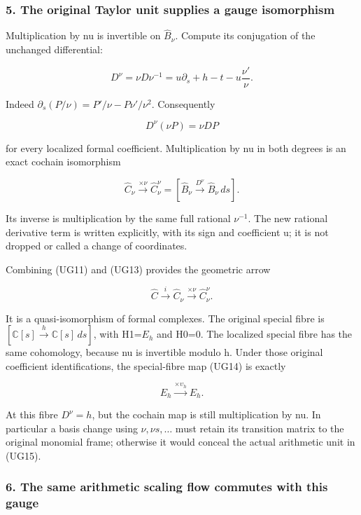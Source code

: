 \subsubsection{5. The original Taylor unit supplies a gauge isomorphism}\label{endpoint-f1_unit_gauge--the-original-taylor-unit-supplies-a-gauge-isomorphism}

Multiplication by nu is invertible on \(\widehat B_\nu\). Compute its conjugation of the unchanged differential:

\[
\boxed{D^{\nu}=\nu D\nu^{-1}
=u\partial_s+h-t-u\frac{\nu'}{\nu}.}
\tag{UG12}
\]

Indeed \(\partial_s(P/\nu)=P'/\nu-P\nu'/\nu^2\). Consequently

\[
D^{\nu}(\nu P)=\nu DP
\]

for every localized formal coefficient. Multiplication by nu in both degrees is an exact cochain isomorphism

\[
\widehat C_\nu\xrightarrow{\times\nu}
\widehat C_\nu^{\nu}
=[\widehat B_\nu\xrightarrow{D^{\nu}}\widehat B_\nu\,ds].
\tag{UG13}
\]

Its inverse is multiplication by the same full rational \(\nu^{-1}\). The new rational derivative term is written explicitly, with its sign and coefficient u; it is not dropped or called a change of coordinates.

Combining (UG11) and (UG13) provides the geometric arrow

\[
\boxed{\widehat C\xrightarrow{i}\widehat C_\nu
\xrightarrow{\times\nu}\widehat C_\nu^{\nu}.}
\tag{UG14}
\]

It is a quasi-isomorphism of formal complexes. The original special fibre is \([\mathbb C[s]\xrightarrow{h}\mathbb C[s]\,ds]\), with H1=\(E_h\) and H0=0. The localized special fibre has the same cohomology, because nu is invertible modulo h. Under those original coefficient identifications, the special-fibre map (UG14) is exactly

\[
E_h\xrightarrow{\times\upsilon_h}E_h.
\tag{UG15}
\]

At this fibre \(D^\nu=h\), but the cochain map is still multiplication by nu. In particular a basis change using \(\nu,\nu s,\ldots\) must retain its transition matrix to the original monomial frame; otherwise it would conceal the actual arithmetic unit in (UG15).

\subsubsection{6. The same arithmetic scaling flow commutes with this gauge}\label{endpoint-f1_unit_gauge--the-same-arithmetic-scaling-flow-commutes-with-this-gauge}

